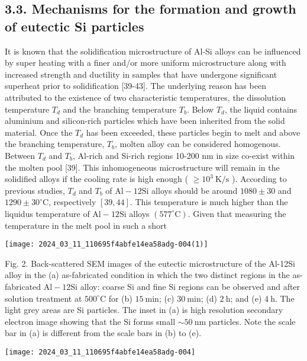 \documentclass[10pt]{article}
\begin{document}
\subsection*{3.3. Mechanisms for the formation and growth of eutectic Si particles}
It is known that the solidification microstructure of Al-Si alloys can be influenced by super heating with a finer and/or more uniform microstructure along with increased strength and ductility in samples that have undergone significant superheat prior to solidification [39-43]. The underlying reason has been attributed to the existence of two characteristic temperatures, the dissolution temperature $T_{d}$ and the branching temperature $T_{b}$. Below $T_{d}$, the liquid contains aluminium and silicon-rich particles which have been inherited from the solid material. Once the $T_{d}$ has been exceeded, these particles begin to melt and above the branching temperature, $T_{b}$, molten alloy can be considered homogenous. Between $T_{d}$ and $T_{b}$, Al-rich and Si-rich regions 10-200 nm in size co-exist within the molten pool [39]. This inhomogeneous microstructure will remain in the solidified alloys if the cooling rate is high enough ( $\geqslant 10^{3} \mathrm{~K} / \mathrm{s}$ ). According to previous studies, $T_{d}$ and $T_{b}$ of $\mathrm{Al}-12 \mathrm{Si}$ alloys should be around $1080 \pm 30$ and $1290 \pm 30^{\circ} \mathrm{C}$, respectively $[39,44]$. This temperature is much higher than the liquidus temperature of $\mathrm{Al}-12 \mathrm{Si}$ alloys $\left(577^{\circ} \mathrm{C}\right)$. Given that measuring the temperature in the melt pool in such a short

\begin{center}
\texttt{[image: 2024\_03\_11\_110695f4abfe14ea58adg-004(1)]}
\end{center}

Fig. 2. Back-scattered SEM images of the eutectic microstructure of the Al-12Si alloy in the (a) as-fabricated condition in which the two distinct regions in the as-fabricated $\mathrm{Al}-12 \mathrm{Si}$ alloy: coarse Si and fine Si regions can be observed and after solution treatment at $500^{\circ} \mathrm{C}$ for (b) $15 \mathrm{~min}$; (c) $30 \mathrm{~min}$; (d) $2 \mathrm{~h}$; and (e) $4 \mathrm{~h}$. The light grey areas are Si particles. The inset in (a) is high resolution secondary electron image showing that the Si forms small $\sim 50 \mathrm{~nm}$ particles. Note the scale bar in (a) is different from the scale bars in (b) to (e).

\begin{center}
\texttt{[image: 2024\_03\_11\_110695f4abfe14ea58adg-004]}
\end{center}
\end{document}
